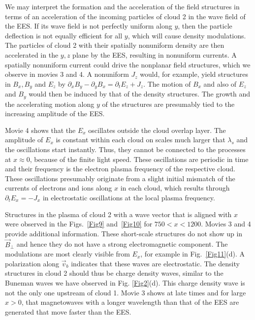\documentclass[structabstract]{aa}
\begin{document}
We may interpret the formation and the acceleration of the field structures 
in terms of an acceleration of the incoming particles of cloud 2 in the 
wave field of the EES. If its wave field is not perfectly uniform along $y$,
then the particle deflection is not equally efficient for all $y$, which
will cause density modulations. The particles of cloud 2 with their spatially 
nonuniform density are then accelerated in the $y,z$ plane by the EES, 
resulting in nonuniform currents. A spatially nonuniform current could drive 
the nonplanar field structures, which we observe in movies 3 and 4. A 
nonuniform $J_z$ would, for example, yield structures in $B_x,B_y$ and $E_z$ 
by $\partial_x B_y - \partial_y B_x = \partial_t E_z + J_z$. The motion of 
$B_x$ and also of $E_z$ and $B_y$ would then be induced by that of the 
density structures. The growth and the accelerating motion along $y$ of the 
structures are presumably tied to the increasing amplitude of the EES.

Movie 4 shows that the $E_x$ oscillates outside the cloud overlap layer. 
The amplitude of $E_x$ is constant within each cloud on scales much larger 
that $\lambda_s$ and the oscillations start instantly. Thus, they cannot 
be connected to the processes at $x \approx 0$, because of the finite light 
speed. These oscillations are periodic in time and their frequency is the 
electron plasma frequency of the respective cloud. These oscillations 
presumably originate from a slight initial mismatch of the currents of 
electrons and ions along $x$ in each cloud, which results through 
$\partial_t E_x = -J_x$ in electrostatic oscillations at the local plasma 
frequency. 

Structures in the plasma of cloud 2 with a wave vector that is aligned with 
$x$ were observed in the Figs.~\ref{Fig9} and~\ref{Fig10} for $750 < x < 
1200$. Movies 3 and 4 provide additional information. These short-scale
structures do not show up in $\vec{B}_\perp$ and hence they do not have a 
strong electromagnetic component. The modulations are most clearly visible 
from $E_x$, for example in Fig.~\ref{Fig11}(d). A polarization along 
$\vec{v}_b$ indicates that these waves are electrostatic. The density 
structures in cloud 2 should thus be charge density waves, similar to the 
Buneman waves we have observed in Fig. \ref{Fig2}(d). This charge density
wave is not the only one upstream of cloud 1. Movie 3 shows at late times 
and for large $x>0$, that magnetowaves with a longer wavelength than that 
of the EES are generated that move faster than the EES. 
\end{document}
